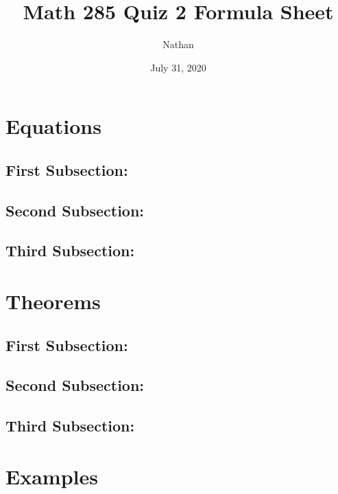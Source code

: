 \documentclass{article}
\title{Math 285 Quiz 2 Formula Sheet}
\author{Nathan}
\date{July 31, 2020}
\begin{document}
\maketitle

\section*{Equations}

\subsection*{First Subsection:}
\setcounter{equation}{0}



\subsection*{Second Subsection:}
\setcounter{equation}{0}



\subsection*{Third Subsection:}
\setcounter{equation}{0}





\section*{Theorems}

\subsection*{First Subsection:}
\setcounter{equation}{0}



\subsection*{Second Subsection:}
\setcounter{equation}{0}



\subsection*{Third Subsection:}
\setcounter{equation}{0}





\section*{Examples}
\end{document}
